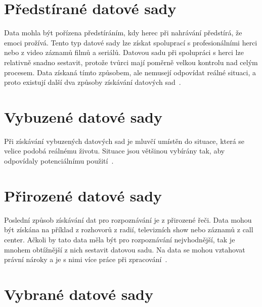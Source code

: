 \documentclass[FM,BP]{tulthesis}
\newcommand{\note}[1]{\todo[color=blue!40]{#1}}
\begin{document}
\section{Předstírané datové sady} %
Data mohla být pořízena předstíráním, kdy herec při nahrávání předstírá, že emoci prožívá. Tento typ datové sady lze získat spoluprací s profesionálními herci nebo z video záznamů filmů a seriálů. Datovou sadu při spolupráci s herci lze relativně snadno sestavit, protože tvůrci mají poměrně velkou kontrolu nad celým procesem. Data získaná tímto způsobem, ale nemusejí odpovídat reálné situaci, a proto existují další dva způsoby získávání datových sad~\cite{konar_chakraborty_2015}.

\section{Vybuzené datové sady} %
Při získávání vybuzených datových sad je mluvčí umístěn do situace, která se velice podobá reálnému životu. Situace jsou většinou vybírány tak, aby odpovídaly potenciálnímu použití~\cite{konar_chakraborty_2015}.

\note{Dát před tabulku}
\section{Přirozené datové sady} %
Poslední způsob získávání dat pro rozpoznávání je z přirozené řeči. Data mohou být získána na příklad z rozhovorů z radií, televizních show nebo záznamů z call center. Ačkoli by tato data měla být pro rozpoznávání nejvhodnější, tak je mnohem obtížnější z nich sestavit datovou sadu. Na data se mohou vztahovat právní nároky a je s nimi více práce při zpracování~\cite{DBLP:journals/speech/AkcayO20}.

\section{Vybrané datové sady}
\end{document}
